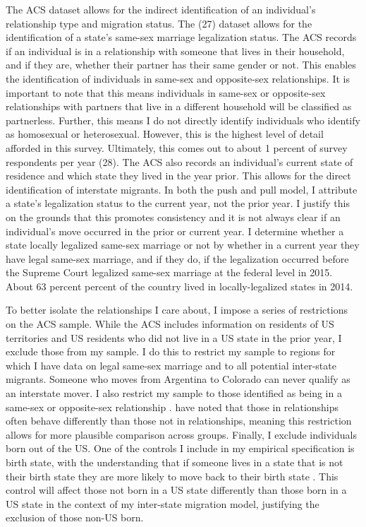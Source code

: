 \documentclass[12pt,letterpaper]{article}
\begin{document}


The ACS dataset allows for the indirect identification of an individual’s relationship type and migration status. The (27) dataset allows for the identification of a state’s same-sex marriage legalization status. The ACS records if an individual is in a relationship with someone that lives in their household, and if they are, whether their partner has their same gender or not. This enables the identification of individuals in same-sex and opposite-sex relationships. It is important to note that this means individuals in same-sex or opposite-sex relationships with partners that live in a different household will be classified as partnerless. Further, this means I do not directly identify individuals who identify as homosexual or heterosexual. However, this is the highest level of detail afforded in this survey. Ultimately, this comes out to about 1 percent of survey respondents per year (28). The ACS also records an individual’s current state of residence and which state they lived in the year prior. This allows for the direct identification of interstate migrants. In both the push and pull model, I attribute a state’s legalization status to the current year, not the prior year. I justify this on the grounds that this promotes consistency and it is not always clear if an individual’s move occurred in the prior or current year. I determine whether a state locally legalized same-sex marriage or not by whether in a current year they have legal same-sex marriage, and if they do, if the legalization occurred before the Supreme Court legalized same-sex marriage at the federal level in 2015. About 63 percent percent of the country lived in locally-legalized states in 2014. 



To better isolate the relationships I care about, I impose a series of restrictions on the ACS sample. While the ACS includes information on residents of US territories and US residents who did not live in a US state in the prior year, I exclude those from my sample. I do this to restrict my sample to regions for which I have data on legal same-sex marriage and to all potential inter-state migrants. Someone who moves from Argentina to Colorado can never qualify as an interstate mover. I also restrict my sample to those identified as being in a same-sex or opposite-sex relationship \citep{1, 16}. have noted that those in relationships often behave differently than those not in relationships, meaning this restriction allows for more plausible comparison across groups. Finally, I exclude individuals born out of the US. One of the controls I include in my empirical specification is birth state, with the understanding that if someone lives in a state that is not their birth state they are more likely to move back to their birth state \citep{12}. This control will affect those not born in a US state differently than those born in a US state in the context of my inter-state migration model, justifying the exclusion of those non-US born.
\end{document}
